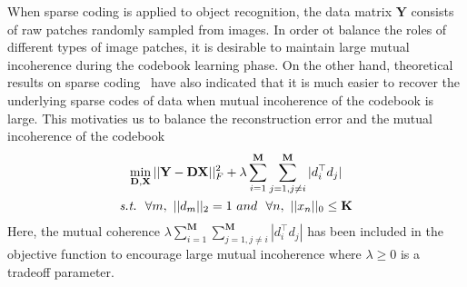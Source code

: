 \documentclass[10pt,twocolumn,letterpaper]{article}
\begin{document}
When sparse coding is applied to object recognition, the data matrix $\mathbf{Y}$ consists of raw patches randomly sampled from images. In order ot balance the roles of different types of image patches, it is desirable to maintain large mutual incoherence during the codebook learning phase. On the other hand, theoretical results on sparse coding~\cite{Sparsity} have also indicated that it is much easier to recover the underlying sparse codes of data when mutual incoherence of the codebook is large. This motivaties us to balance the reconstruction error and the mutual incoherence of the codebook~\cite{multipath}\\
\begin{gather}
\mathop{\min}\limits_{\mathbf{D},\mathbf{X}}||\mathbf{Y} - \mathbf{DX}||_F^2 + \lambda\sum_{i=1}^\mathbf{M}\sum_{j=1,j\ne i}^{\mathbf{M}}|d_i^{\top}d_j|\\
\text{\emph{s.t.}}~~\forall m,~||d_m||_2 = 1~and~~\forall n,~||x_n||_0 \le \mathbf{K} \notag
\end{gather}
Here, the mutual coherence $\lambda\sum_{i=1}^\mathbf{M}\sum_{j=1,j\ne i}^{\mathbf{M}}|d_i^{\top}d_j|$ has been included in the objective function to encourage large mutual incoherence where $\lambda \ge 0$ is a tradeoff parameter.


{\small


}
\end{document}
